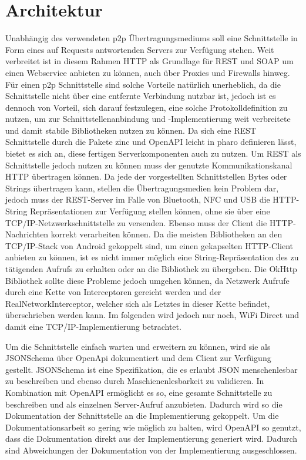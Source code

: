 \section{Architektur}

    Unabhängig des verwendeten p2p Übertragungsmediums soll eine Schnittstelle in Form eines auf Requests antwortenden Servers zur Verfügung stehen.
	Weit verbreitet ist in diesem Rahmen HTTP als Grundlage für REST und SOAP um einen Webservice anbieten zu können, auch über Proxies und Firewalls hinweg. Für einen p2p Schnittstelle sind solche Vorteile natürlich unerheblich, da die Schnittstelle nicht über eine entfernte Verbindung nutzbar ist, jedoch ist es dennoch von Vorteil, sich darauf festzulegen, eine solche Protokolldefinition zu nutzen, um zur Schnittstellenanbindung und -Implementierung weit verbreitete und damit stabile Bibliotheken nutzen zu können.
    Da sich eine REST Schnittstelle durch die Pakete zinc\cite{pharoZinc} und OpenAPI \cite{pharoOpenApi} leicht in pharo definieren lässt, bietet es sich an, diese fertigen Serverkomponenten auch zu nutzen.
    Um REST als Schnittstelle jedoch nutzen zu können muss der genutzte Kommunikationskanal HTTP übertragen können. Da jede der vorgestellten Schnittstellen Bytes oder Strings
    übertragen kann, stellen die Übertragungsmedien kein Problem dar, jedoch muss der REST-Server im Falle von Bluetooth, NFC und USB die HTTP-String Repräsentationen zur Verfügung stellen können,
    ohne sie über eine TCP/IP-Netzwerkschnittstelle zu versenden. Ebenso muss der Client die HTTP-Nachrichten korrekt verarbeiten können.
    Da die meisten Bibliotheken an den TCP/IP-Stack von Android gekoppelt sind, um einen gekapselten HTTP-Client anbieten zu können, ist es nicht immer möglich eine String-Repräsentation des zu tätigenden Aufrufs zu erhalten oder an die Bibliothek zu übergeben.
    Die OkHttp Bibliothek\cite{AndroidOkHttp} sollte diese Probleme jedoch umgehen können, da Netzwerk Aufrufe durch eine Kette von Interceptoren gereicht werden und der RealNetworkInterceptor,
    welcher sich als Letztes in dieser Kette befindet, überschrieben werden kann.
	Im folgenden wird jedoch nur noch, WiFi Direct und damit eine TCP/IP-Implementierung betrachtet.
	
    Um die Schnittstelle einfach warten und erweitern zu können, wird sie als JSONSchema über OpenApi dokumentiert und dem Client zur Verfügung gestellt.
    JSONSchema ist eine Spezifikation, die es erlaubt JSON menschenlesbar zu beschreiben und ebenso durch Maschienenlesbarkeit zu validieren. \cite{JsonSchema} In Kombination mit OpenAPI ermöglicht es so, eine gesamte Schnittstelle zu beschreiben und als einzelnen Server-Aufruf anzubieten. \cite{OpenApi} Dadurch wird so die Dokumentation der Schnittstelle an die Implementierung gekoppelt. Um die Dokumentationsarbeit so gering wie möglich zu halten, wird OpenAPI so genutzt, dass die Dokumentation direkt aus der Implementierung generiert wird. Dadurch sind Abweichungen der Dokumentation von der Implementierung ausgeschlossen.

